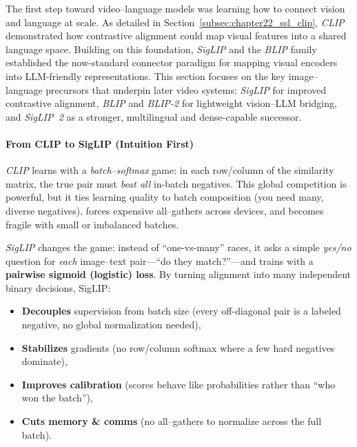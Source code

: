 \begin{enrichment}
    \label{enr:sec_chapter24_vlprecursors}
    The first step toward video--language models was learning how to connect vision and language at scale. As detailed in Section~\ref{subsec:chapter22_ssl_clip}, \emph{CLIP} demonstrated how contrastive alignment could map visual features into a shared language space. Building on this foundation, \emph{SigLIP} and the \emph{BLIP} family established the now-standard connector paradigm for mapping visual encoders into LLM-friendly representations. This section focuses on the key image--language precursors that underpin later video systems: \emph{SigLIP} for improved contrastive alignment, \emph{BLIP} and \emph{BLIP-2} for lightweight vision--LLM bridging, and \emph{SigLIP~2} as a stronger, multilingual and dense-capable successor.
    
    \begin{enrichment}
        \label{enr:subsec_chapter24_siglip}
        
        \paragraph{From CLIP to SigLIP (Intuition First)}
        \emph{CLIP} learns with a \emph{batch–softmax} game: in each row/column of the similarity matrix, the true pair must \emph{beat all} in-batch negatives. This global competition is powerful, but it ties learning quality to batch composition (you need many, diverse negatives), forces expensive all–gathers across devices, and becomes fragile with small or imbalanced batches.  
        
        \emph{SigLIP} \cite{zhai2023_siglip} changes the game: instead of “one-vs-many” races, it asks a simple \emph{yes/no} question for \emph{each} image–text pair—“do they match?”—and trains with a \textbf{pairwise sigmoid (logistic) loss}. By turning alignment into many independent binary decisions, SigLIP:
        \begin{itemize}
            \item \textbf{Decouples} supervision from batch size (every off-diagonal pair is a labeled negative, no global normalization needed),
            \item \textbf{Stabilizes} gradients (no row/column softmax where a few hard negatives dominate),
            \item \textbf{Improves calibration} (scores behave like probabilities rather than “who won the batch”),
            \item \textbf{Cuts memory \& comms} (no all–gathers to normalize across the full batch).
        \end{itemize}
        

\end{enrichment}
\end{enrichment}
